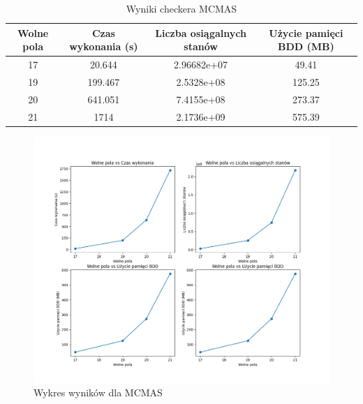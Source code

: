     \begin{table}[h!]
      \centering
      \begin{tabular}{|c|c|c|c|}
      \hline
      Wolne pola & Czas wykonania (s) & Liczba osiągalnych stanów & Użycie pamięci BDD (MB)  \\
      \hline
      17 &  20.644 & 2.96682e+07  & 49.41   \\
       19 & 199.467 &2.5328e+08 & 125.25 \\
       20& 641.051 &7.4155e+08 & 273.37 \\
       21 & 1714 &2.1736e+09 & 575.39 \\
      \hline
      \end{tabular}
      \caption{Wyniki checkera MCMAS}
      \label{table:mcmas_results}
      \end{table}
      \begin{figure}[h]
        \centering
        \includegraphics[width=\linewidth]{figures/wykres_wyniki_mcmas_1.png}
        \caption{Wykres wyników dla MCMAS}
        \label{fig:enter-label}
    \end{figure}


